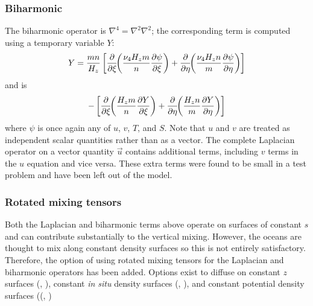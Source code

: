 \subsubsection{Biharmonic}
The biharmonic operator is $\nabla^4 = \nabla^2 \nabla^2$; the
corresponding term is computed using a temporary variable $Y$:
\begin{equation}
   Y =
   {mn \over H_z} \left[ 
   {\partial \over \partial \xi} \!\! \left( {\nu_4 H_zm \over n} 
   {\partial \psi \over \partial \xi} \right) +
   {\partial \over \partial \eta} \!\! \left( {\nu_4 H_zn \over m} 
   {\partial \psi \over \partial \eta} \right) \right]
\end{equation}
and is
\begin{equation}
   - \left[ 
   {\partial \over \partial \xi} \!\! \left( {H_zm \over n} 
   {\partial Y \over \partial \xi} \right) +
   {\partial \over \partial \eta} \!\! \left( {H_zn \over m} 
   {\partial Y \over \partial \eta} \right) \right]
\end{equation}
where $\psi$ is once again any of $u$, $v$, $T$, and $S$.  Note that
$u$ and $v$ are treated as independent scalar quantities rather than as
a vector.  The complete Laplacian operator on a vector quantity
$\vec{u}$ contains additional terms, including $v$ terms in the $u$
equation and vice versa.  These extra terms were found to be small in a
test problem and have been left out of the model.

\subsubsection{Rotated mixing tensors}
Both the Laplacian and biharmonic terms above operate on surfaces of
constant $s$ and can contribute substantially to the vertical mixing.
However, the oceans are thought
to mix along constant density surfaces so this is not entirely
satisfactory.  Therefore, the option of using rotated mixing tensors
for the Laplacian and biharmonic operators has been added.  Options
exist to diffuse on constant $z$ surfaces (,
), constant {\sl in situ} density surfaces
(, ), and constant potential
density surfaces ((, )

